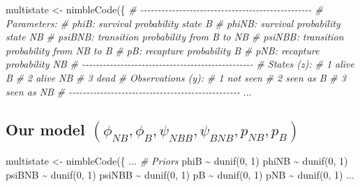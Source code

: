 \documentclass[
  12pt,
]{krantz}
\newenvironment{Shaded}{\begin{snugshade}}{\end{snugshade}}
\newcommand{\CommentTok}[1]{\textcolor[rgb]{0.56,0.35,0.01}{\textit{#1}}}
\newcommand{\DecValTok}[1]{\textcolor[rgb]{0.00,0.00,0.81}{#1}}
\newcommand{\FunctionTok}[1]{\textcolor[rgb]{0.00,0.00,0.00}{#1}}
\newcommand{\NormalTok}[1]{#1}
\newcommand{\OtherTok}[1]{\textcolor[rgb]{0.56,0.35,0.01}{#1}}
\newcommand{\SpecialCharTok}[1]{\textcolor[rgb]{0.00,0.00,0.00}{#1}}
\begin{document}
\begin{Shaded}
\begin{Highlighting}[]
\NormalTok{multistate }\OtherTok{\textless{}{-}} \FunctionTok{nimbleCode}\NormalTok{(\{}
  \CommentTok{\# {-}{-}{-}{-}{-}{-}{-}{-}{-}{-}{-}{-}{-}{-}{-}{-}{-}{-}{-}{-}{-}{-}{-}{-}{-}{-}{-}{-}{-}{-}{-}{-}{-}{-}{-}{-}{-}{-}{-}{-}{-}{-}{-}{-}{-}{-}{-}{-}{-}}
  \CommentTok{\# Parameters:}
  \CommentTok{\# phiB: survival probability state B}
  \CommentTok{\# phiNB: survival probability state NB}
  \CommentTok{\# psiBNB: transition probability from B to NB}
  \CommentTok{\# psiNBB: transition probability from NB to B}
  \CommentTok{\# pB: recapture probability B}
  \CommentTok{\# pNB: recapture probability NB}
  \CommentTok{\# {-}{-}{-}{-}{-}{-}{-}{-}{-}{-}{-}{-}{-}{-}{-}{-}{-}{-}{-}{-}{-}{-}{-}{-}{-}{-}{-}{-}{-}{-}{-}{-}{-}{-}{-}{-}{-}{-}{-}{-}{-}{-}{-}{-}{-}{-}{-}{-}{-}}
  \CommentTok{\# States (z):}
  \CommentTok{\# 1 alive B}
  \CommentTok{\# 2 alive NB}
  \CommentTok{\# 3 dead}
  \CommentTok{\# Observations (y):}
  \CommentTok{\# 1 not seen}
  \CommentTok{\# 2 seen as B}
  \CommentTok{\# 3 seen as NB}
  \CommentTok{\# {-}{-}{-}{-}{-}{-}{-}{-}{-}{-}{-}{-}{-}{-}{-}{-}{-}{-}{-}{-}{-}{-}{-}{-}{-}{-}{-}{-}{-}{-}{-}{-}{-}{-}{-}{-}{-}{-}{-}{-}{-}{-}{-}{-}{-}{-}{-}{-}{-}}
\NormalTok{...}
\end{Highlighting}
\end{Shaded}

\hypertarget{our-model-phi_nb-phi_b-psi_nbb-psi_bnb-p_nb-p_b-1}{%
\subsection{\texorpdfstring{Our model \((\phi_{NB}, \phi_B, \psi_{NBB}, \psi_{BNB}, p_{NB}, p_B)\)}{Our model (\textbackslash phi\_\{NB\}, \textbackslash phi\_B, \textbackslash psi\_\{NBB\}, \textbackslash psi\_\{BNB\}, p\_\{NB\}, p\_B)}}\label{our-model-phi_nb-phi_b-psi_nbb-psi_bnb-p_nb-p_b-1}}

\begin{Shaded}
\begin{Highlighting}[]
\NormalTok{multistate }\OtherTok{\textless{}{-}} \FunctionTok{nimbleCode}\NormalTok{(\{}
\NormalTok{...}
  \CommentTok{\# Priors}
\NormalTok{  phiB }\SpecialCharTok{\textasciitilde{}} \FunctionTok{dunif}\NormalTok{(}\DecValTok{0}\NormalTok{, }\DecValTok{1}\NormalTok{)}
\NormalTok{  phiNB }\SpecialCharTok{\textasciitilde{}} \FunctionTok{dunif}\NormalTok{(}\DecValTok{0}\NormalTok{, }\DecValTok{1}\NormalTok{)}
\NormalTok{  psiBNB }\SpecialCharTok{\textasciitilde{}} \FunctionTok{dunif}\NormalTok{(}\DecValTok{0}\NormalTok{, }\DecValTok{1}\NormalTok{)}
\NormalTok{  psiNBB }\SpecialCharTok{\textasciitilde{}} \FunctionTok{dunif}\NormalTok{(}\DecValTok{0}\NormalTok{, }\DecValTok{1}\NormalTok{)}
\NormalTok{  pB }\SpecialCharTok{\textasciitilde{}} \FunctionTok{dunif}\NormalTok{(}\DecValTok{0}\NormalTok{, }\DecValTok{1}\NormalTok{)}
\NormalTok{  pNB }\SpecialCharTok{\textasciitilde{}} \FunctionTok{dunif}\NormalTok{(}\DecValTok{0}\NormalTok{, }\DecValTok{1}\NormalTok{)}
\NormalTok{...}
\end{Highlighting}
\end{Shaded}
\end{document}
